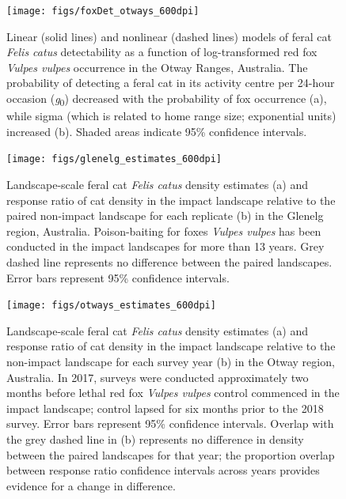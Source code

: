 \documentclass[]{elsarticle} %
\begin{document}
\begin{figure}

{\centering \texttt{[image: figs/foxDet\_otways\_600dpi]} 

}

\caption{Linear (solid lines) and nonlinear (dashed lines) models of feral cat \textit{Felis catus} detectability as a function of log-transformed red fox \textit{Vulpes vulpes} occurrence in the Otway Ranges, Australia. The probability of detecting a feral cat in its activity centre per 24-hour occasion (\textit{g}\textsubscript{0}) decreased with the probability of fox occurrence (a), while sigma (which is related to home range size; exponential units) increased (b). Shaded areas indicate 95\% confidence intervals.}\label{fig:detcor}
\end{figure}

\newpage

\begin{figure}

{\centering \texttt{[image: figs/glenelg\_estimates\_600dpi]} 

}

\caption{Landscape-scale feral cat \textit{Felis catus} density estimates (a) and response ratio of cat density in the impact landscape relative to the paired non-impact landscape for each replicate (b) in the Glenelg region, Australia. Poison-baiting for foxes \textit{Vulpes vulpes} has been conducted in the impact landscapes for more than 13 years. Grey dashed line represents no difference between the paired landscapes. Error bars represent 95\% confidence intervals.}\label{fig:diffg}
\end{figure}

\newpage

\begin{figure}

{\centering \texttt{[image: figs/otways\_estimates\_600dpi]} 

}

\caption{Landscape-scale feral cat \textit{Felis catus} density estimates (a) and response ratio of cat density in the impact landscape relative to the non-impact landscape for each survey year (b) in the Otway region, Australia. In 2017, surveys were conducted approximately two months before lethal red fox \textit{Vulpes vulpes} control commenced in the impact landscape; control lapsed for six months prior to the 2018 survey. Error bars represent 95\% confidence intervals. Overlap with the grey dashed line in (b) represents no difference in density between the paired landscapes for that year; the proportion overlap between response ratio confidence intervals across years provides evidence for a change in difference.}\label{fig:diffo}
\end{figure}
\end{document}
